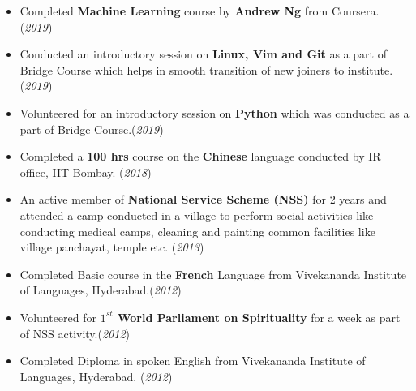 \documentclass[10pt]{article}
\begin{document}
\colorbox{bl}{}
\vspace{-0.5cm}
\begin{itemize}[leftmargin=0.4cm]
	\item {Completed \textbf{Machine Learning} course by \textbf{Andrew Ng} from Coursera. }\hfill{(\textit{2019})}\vspace{-0.25cm}
	\item {Conducted an introductory session on \textbf{Linux, Vim and Git} as a part of Bridge Course which helps in smooth transition of new joiners to institute. }\hfill{(\textit{2019})}\vspace{-0.25cm}
	\item {Volunteered for an introductory session on \textbf{Python} which was conducted as a part of Bridge Course.}\hfill{(\textit{2019})}\vspace{-0.25cm}
    \item {Completed a \textbf{100 hrs} course on the \textbf{Chinese} language conducted by IR office, IIT Bombay. }\hfill{(\textit{2018})}\vspace{-0.25cm}
	\item {An active member of \textbf{National Service Scheme (NSS)} for 2 years and attended a camp conducted in a village to perform social activities like conducting medical camps, cleaning and painting common facilities like village panchayat, temple etc.} \hfill{(\textit{2013})}\vspace{-0.25cm}
    \item {Completed Basic course in the \textbf{French} Language from Vivekananda Institute of Languages, Hyderabad.}\hfill{(\textit{2012})}\vspace{-0.25cm}
   	\item {Volunteered for \textbf{$1^{st}$ World Parliament on Spirituality} for a week as part of NSS activity.}\hfill{(\textit{2012})}\vspace{-0.25cm}
	\item {Completed Diploma in spoken English from Vivekananda Institute of Languages, Hyderabad.} \hfill{(\textit{2012})}\vspace{-0.2cm}
   
\end{itemize}

\end{document}
